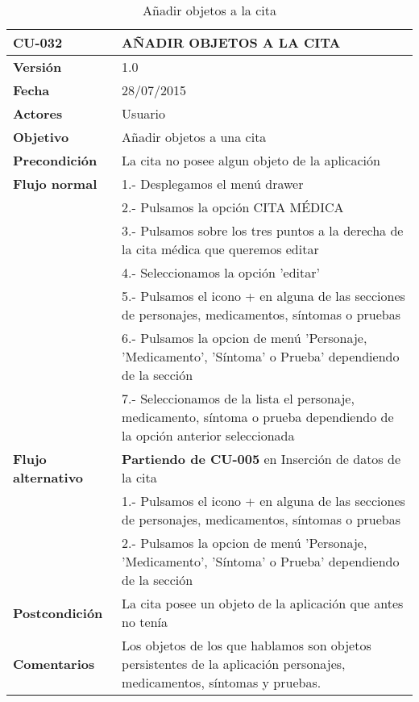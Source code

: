 \documentclass[../pfc.tex]{subfiles}
\begin{document}
	\begin{table}[H]
		\centering
		\begin{tabular}[t]{|p{3cm}|p{9.5cm}|}
			\hline \textbf{CU-032} & \textbf{AÑADIR OBJETOS A LA CITA}\\*
			\hline\hline \textbf{Versión} & 1.0 \\*
			\hline\hline \textbf{Fecha} & 28/07/2015 \\*
			\hline\textbf{Actores} 	& Usuario\\*
			\hline \textbf{Objetivo} & Añadir objetos a una cita\\* 			
			\hline \textbf{Precondición} & La cita no posee algun objeto de la aplicación\\* 
			\hline \textbf{Flujo normal} & 1.- Desplegamos el menú drawer \\* 
			& 2.- Pulsamos la opción CITA MÉDICA\\*	
			& 3.- Pulsamos sobre los tres puntos a la derecha de la cita médica que queremos editar\\*	
			& 4.- Seleccionamos la opción 'editar'\\*	
			& 5.- Pulsamos el icono + en alguna de las secciones de personajes, medicamentos, síntomas o pruebas\\*
			& 6.- Pulsamos la opcion de menú 'Personaje, 'Medicamento', 'Síntoma' o Prueba' dependiendo de la sección\\*
			& 7.- Seleccionamos de la lista el personaje, medicamento, síntoma o prueba dependiendo de la opción anterior seleccionada\\*
			\hline \textbf{Flujo alternativo} & \textbf{Partiendo de CU-005} en Inserción de datos de la cita\\*  
			& 1.- Pulsamos el icono + en alguna de las secciones de personajes, medicamentos, síntomas o pruebas\\*
			& 2.- Pulsamos la opcion de menú 'Personaje, 'Medicamento', 'Síntoma' o Prueba' dependiendo de la sección\\*
			\hline \textbf{Postcondición} & La cita posee un objeto de la aplicación que antes no tenía\\* 
			\hline \textbf{Comentarios}   & Los objetos de los que hablamos son objetos persistentes de la aplicación personajes, medicamentos, síntomas y pruebas.\\*
			\hline
		\end{tabular}
		\caption{Añadir objetos a la cita}
		\label{tabla:caso034}
	\end{table}
			
\end{document}
